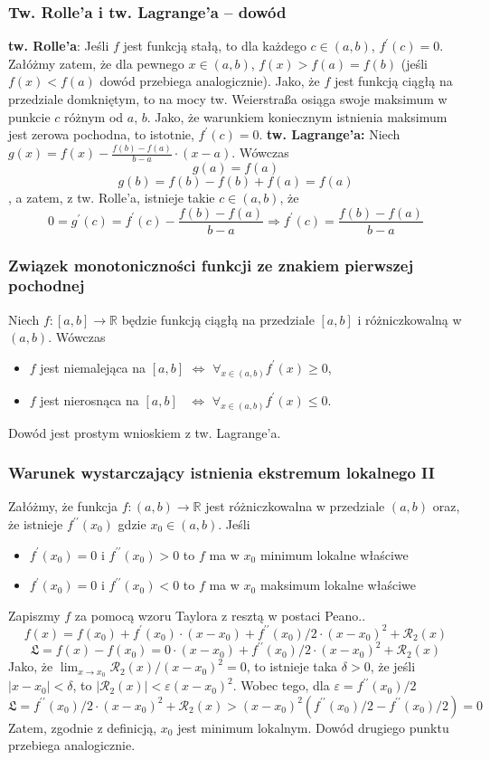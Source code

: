 \documentclass[11pt]{beamer}
\newcommand{\below}[1]{\displaystyle\mathop{#1}}
\begin{document}
\begin{frame}
\frametitle{Tw. Rolle'a i tw. Lagrange'a -- dowód}
{\bf tw. Rolle'a}: Jeśli $f$ jest funkcją stałą, to dla każdego $c \in (a, b)$, $f^\prime(c) = 0$. Załóżmy zatem, że dla pewnego $x \in (a, b)$, $f(x) > f(a) = f(b)$ (jeśli $f(x) < f(a)$ dowód przebiega analogicznie). Jako, że $f$ jest funkcją ciągłą na przedziale domkniętym, to na mocy tw. Weierstraßa osiąga swoje maksimum w punkcie $c$ różnym od $a$, $b$. Jako, że warunkiem koniecznym istnienia maksimum jest zerowa pochodna, to istotnie, $f^\prime(c) = 0$.
\newline
{\bf tw. Lagrange'a:} Niech $g(x) = f(x) - \frac{f(b)-f(a)}{b-a} \cdot(x - a)$. Wówczas \[g(a) = f(a)\] \[g(b) = f(b) - f(b) + f(a) = f(a)\], a zatem, z tw. Rolle'a, istnieje takie $c \in (a, b)$, że \[0 = g^\prime(c) = f^\prime(c) - \frac{f(b)-f(a)}{b-a} \Rightarrow f^\prime(c) = \frac{f(b)-f(a)}{b-a}\]
\end{frame}
\begin{frame}
\frametitle{Związek monotoniczności funkcji ze znakiem pierwszej pochodnej}
Niech $f : [a, b] \rightarrow \mathbb R$ będzie funkcją ciągłą na przedziale $[a, b]$ i różniczkowalną
w $(a, b)$. Wówczas
\begin{itemize}
\item $f$ jest niemalejąca na $[a, b]$ \quad $\Leftrightarrow$ \quad $\below{\forall}_{x \in (a, b)} f^\prime (x) \geq 0$,
\item $f$ jest nierosnąca na $[a, b]$ \, \quad $\Leftrightarrow$ \quad $\below{\forall}_{x \in (a, b)} f^\prime (x) \leq 0$.
\end{itemize}
Dowód jest prostym wnioskiem z tw. Lagrange'a.

\end{frame}

\begin{frame}
\frametitle{Warunek wystarczający istnienia ekstremum lokalnego II}
Załóżmy, że funkcja $f : (a, b)\rightarrow \mathbb{R}$ jest różniczkowalna w przedziale $(a, b)$ oraz, że istnieje $f^{\prime\prime}(x_0)$ gdzie $x_0 \in (a, b)$. Jeśli
\begin{itemize}
\item $f^\prime(x_0) = 0$ i $f^{\prime\prime}(x_0 ) > 0$ to $f$ ma w $x_0$ minimum lokalne właściwe
\item $f^\prime(x_0) = 0$ i $f^{\prime\prime}(x_0 ) < 0$ to $f$ ma w $x_0$ maksimum lokalne właściwe
\end{itemize}
Zapiszmy $f$ za pomocą wzoru Taylora z resztą w postaci Peano..
\[
f(x) = f(x_0) + f^\prime(x_0) \cdot(x - x_0) + f^{\prime\prime}(x_0)/2 \cdot(x-x_0)^2 + \mathcal{R}_2(x)
\]
\[
\mathfrak{L} = f(x) - f(x_0) = 0 \cdot (x-x_0) + f^{\prime\prime}(x_0)/2 \cdot(x-x_0)^2 + \mathcal{R}_2(x)
\]
Jako, że $\below{\lim}_{x\rightarrow x_0} \mathcal{R}_2(x)/(x-x_0)^2 = 0$, to istnieje taka $\delta > 0$, że jeśli $|x - x_0 | < \delta$, to $|\mathcal R_2(x) | < \varepsilon (x - x_0)^2$. Wobec tego, dla $\varepsilon = f^{\prime\prime}(x_0)/2$
\[
\mathfrak{L} = f^{\prime\prime}(x_0)/2 \cdot(x-x_0)^2 + \mathcal{R}_2(x) > (x - x_0)^2\left( f^{\prime\prime}(x_0)/2  - f^{\prime\prime}(x_0)/2\right) = 0
\]
Zatem, zgodnie z definicją, $x_0$ jest minimum lokalnym. Dowód drugiego punktu przebiega analogicznie.
\end{frame}
\end{document}
